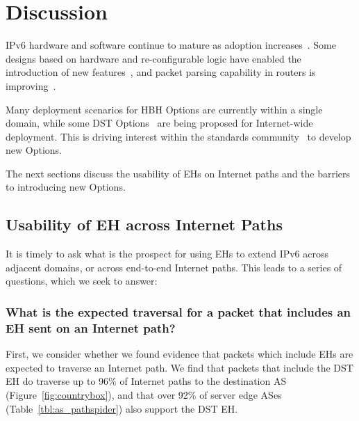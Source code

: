 \documentclass[conference]{IEEEtran}
\begin{document}

\section{Discussion} 
\label{sec:discussion}

IPv6 hardware and software continue to mature as adoption increases~\cite{v6adoption_ton}.
Some designs based on hardware and re-configurable logic have enabled the introduction of new features~\cite{cisco-silicon-one}, and packet parsing capability in routers is improving~\cite{metamorphosis, hauser2023}.

Many deployment scenarios for HBH Options are currently within a single domain, while some DST Options~\cite{ietf-ippm-ioam-ipv6-options-12} are being proposed for Internet-wide deployment.
This is driving interest within the standards community~\cite{ietf-6man-HBH-processing-06, ietf-v6ops-hbh-03, ietf-6man-eh-limits-04} to develop new Options.

The next sections discuss the usability of EHs on Internet paths and the barriers to introducing new Options.


\subsection{Usability of EH across Internet Paths}
  


It is timely to ask what is the prospect for using EHs to extend IPv6 across adjacent domains, or across end-to-end Internet paths. This leads to a series of questions, which we seek to answer: 
\subsubsection{What is the expected traversal for a packet that includes an EH sent on an Internet path?}
First, we consider whether we found evidence that packets which include EHs are expected to traverse an Internet path.
We find that packets that include the DST EH do traverse up to 96\% of Internet paths to the destination AS (Figure~\ref{fig:countrybox}), and that over 92\% of server edge ASes (Table~\ref{tbl:as_pathspider}) also support the DST EH. 
\end{document}
